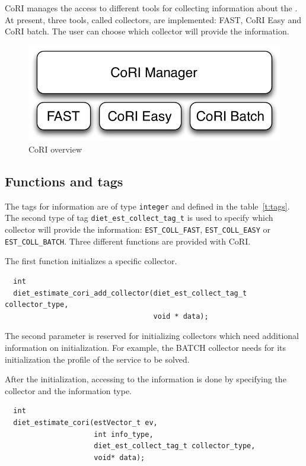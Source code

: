 CoRI manages the access to different tools for collecting information
about the \sed. At present, three tools, called collectors, are
implemented: FAST, CoRI Easy and CoRI batch. The user can choose which
collector will provide the information.

\begin{figure}[h]
  \begin{center}
    \includegraphics[scale=0.5]{fig/overviewCori}
    \caption{CoRI overview}
    \label{fig:cori-overview}
  \end{center}
\end{figure}

\subsection{Functions and tags}
The tags for information are of type \texttt{integer} and defined in
the table~\ref{t:tags}. The second type of tag
\texttt{diet\_est\_collect\_tag\_t} is used to specify which collector
will provide the information: \texttt{EST\_COLL\_FAST},
\texttt{EST\_COLL\_EASY} or \texttt{EST\_COLL\_BATCH}. Three different
functions are provided with CoRI.

The first function initializes a specific collector.

\footnotesize
\begin{verbatim}
  int
  diet_estimate_cori_add_collector(diet_est_collect_tag_t collector_type,
                                   void * data);
\end{verbatim}
\normalsize The second parameter is reserved for initializing
collectors which need additional information on initialization. For
example, the BATCH collector needs for its initialization the profile
of the service to be solved.

After the initialization, accessing to the information is done by
specifying the collector and the information type. 
\footnotesize
\begin{verbatim}
  int
  diet_estimate_cori(estVector_t ev,
                     int info_type,
                     diet_est_collect_tag_t collector_type,
                     void* data);
\end{verbatim}
\normalsize

